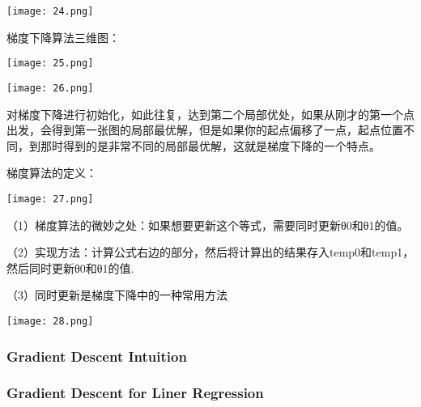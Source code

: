 \documentclass{article}
\begin{document}
\begin{CJK}{UTF8}{gbsn}
\texttt{[image: 24.png]}

梯度下降算法三维图：

\texttt{[image: 25.png]}

\texttt{[image: 26.png]}

对梯度下降进行初始化，如此往复，达到第二个局部优处，如果从刚才的第一个点出发，会得到第一张图的局部最优解，但是如果你的起点偏移了一点，起点位置不同，到那时得到的是非常不同的局部最优解，这就是梯度下降的一个特点。

梯度算法的定义：

\texttt{[image: 27.png]}

（1）梯度算法的微妙之处：如果想要更新这个等式，需要同时更新θ0和θ1的值。

（2）实现方法：计算公式右边的部分，然后将计算出的结果存入temp0和temp1，然后同时更新θ0和θ1的值.

（3）同时更新是梯度下降中的一种常用方法

\texttt{[image: 28.png]}

\subsubsection{Gradient Descent Intuition}

\subsubsection{Gradient Descent for Liner Regression}


\end{CJK}
\end{document}
